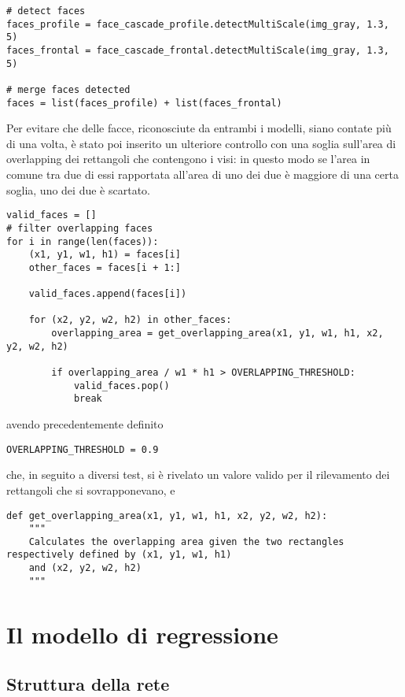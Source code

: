 \begin{verbatim}
# detect faces
faces_profile = face_cascade_profile.detectMultiScale(img_gray, 1.3, 5)
faces_frontal = face_cascade_frontal.detectMultiScale(img_gray, 1.3, 5)

# merge faces detected
faces = list(faces_profile) + list(faces_frontal)
\end{verbatim} 

Per evitare che delle facce, riconosciute da entrambi i modelli, siano contate più di una volta, è stato poi
inserito un ulteriore controllo con una soglia sull'area di overlapping dei rettangoli che contengono i visi:
in questo modo se l'area in comune tra due di essi rapportata all'area di uno dei due è maggiore di una certa 
soglia, uno dei due è scartato.

\begin{verbatim}
valid_faces = []
# filter overlapping faces
for i in range(len(faces)):
    (x1, y1, w1, h1) = faces[i]
    other_faces = faces[i + 1:]

    valid_faces.append(faces[i])

    for (x2, y2, w2, h2) in other_faces:
        overlapping_area = get_overlapping_area(x1, y1, w1, h1, x2, y2, w2, h2)

        if overlapping_area / w1 * h1 > OVERLAPPING_THRESHOLD:
            valid_faces.pop()
            break
\end{verbatim}
\noindent
avendo precedentemente definito

\begin{verbatim}
OVERLAPPING_THRESHOLD = 0.9
\end{verbatim} 

\noindent
che, in seguito a diversi test, si è rivelato un valore valido per il rilevamento 
dei rettangoli che si sovrapponevano, e

\begin{verbatim}
def get_overlapping_area(x1, y1, w1, h1, x2, y2, w2, h2):
    """
    Calculates the overlapping area given the two rectangles respectively defined by (x1, y1, w1, h1)
    and (x2, y2, w2, h2)
    """
\end{verbatim} 

\section{Il modello di regressione}
\label{section:methods_ml}

\subsection{Struttura della rete}
\label{section:methods_ml_structure}

